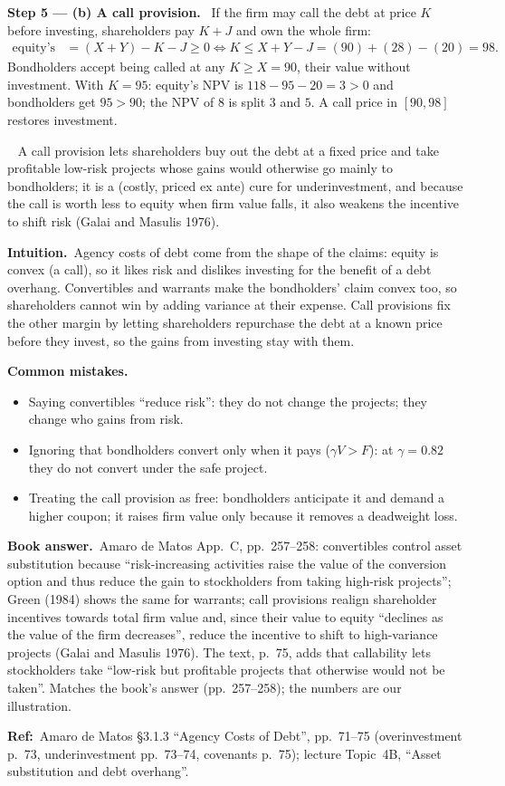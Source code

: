 \documentclass[11pt,a4paper]{article}
\newcommand{\step}[2]{\par\medskip\noindent\textbf{Step #1 --- #2.}~}
\newcommand{\intuition}{\par\medskip\noindent\textbf{Intuition.}~}
\newcommand{\bookans}{\par\medskip\noindent\textbf{Book answer.}~}
\newcommand{\refbib}{\par\smallskip\noindent\textbf{Ref:}~}
\newcommand{\answer}[1]{\par\smallskip\noindent\fbox{\textbf{Answer #1.}}~}
\newcommand{\pitfalls}{\par\medskip\noindent\textbf{Common mistakes.}}
\begin{document}
\step{5}{(b) A call provision} If the firm may call the debt at price $K$ before investing, shareholders pay $K+J$ and own the whole firm:
\begin{align}
  \text{equity's NPV} &= (X+Y) - K - J \ge 0 \iff K \le X+Y-J = (90)+(28)-(20) = 98. \nonumber
\end{align}
Bondholders accept being called at any $K\ge X=90$, their value without investment. With $K=95$: equity's NPV is $118-95-20=3>0$ and bondholders get $95>90$; the NPV of $8$ is split $3$ and $5$. A call price in $[90,98]$ restores investment.
\answer{(b)} A call provision lets shareholders buy out the debt at a fixed price and take profitable low-risk projects whose gains would otherwise go mainly to bondholders; it is a (costly, priced ex ante) cure for underinvestment, and because the call is worth less to equity when firm value falls, it also weakens the incentive to shift risk (Galai and Masulis 1976).

\intuition Agency costs of debt come from the shape of the claims: equity is convex (a call), so it likes risk and dislikes investing for the benefit of a debt overhang. Convertibles and warrants make the bondholders' claim convex too, so shareholders cannot win by adding variance at their expense. Call provisions fix the other margin by letting shareholders repurchase the debt at a known price before they invest, so the gains from investing stay with them.

\pitfalls
\begin{itemize}
  \item Saying convertibles ``reduce risk'': they do not change the projects; they change who gains from risk.
  \item Ignoring that bondholders convert only when it pays ($\gamma V>F$): at $\gamma=0.82$ they do not convert under the safe project.
  \item Treating the call provision as free: bondholders anticipate it and demand a higher coupon; it raises firm value only because it removes a deadweight loss.
\end{itemize}

\bookans Amaro de Matos App.~C, pp.~257--258: convertibles control asset substitution because ``risk-increasing activities raise the value of the conversion option and thus reduce the gain to stockholders from taking high-risk projects''; Green (1984) shows the same for warrants; call provisions realign shareholder incentives towards total firm value and, since their value to equity ``declines as the value of the firm decreases'', reduce the incentive to shift to high-variance projects (Galai and Masulis 1976). The text, p.~75, adds that callability lets stockholders take ``low-risk but profitable projects that otherwise would not be taken''. Matches the book's answer (pp.~257--258); the numbers are our illustration.
\refbib{Amaro de Matos \S3.1.3 ``Agency Costs of Debt'', pp.~71--75 (overinvestment p.~73, underinvestment pp.~73--74, covenants p.~75); lecture Topic~4B, ``Asset substitution and debt overhang''.}
\end{document}
